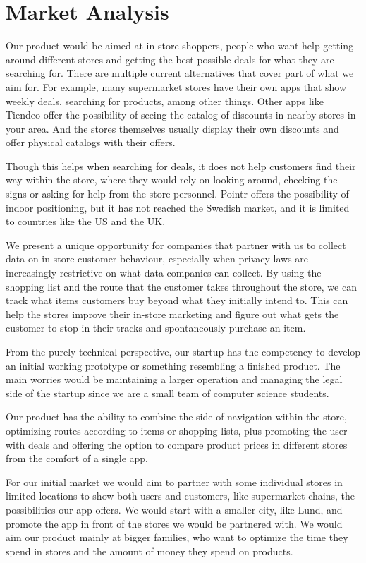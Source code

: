 \documentclass[titlepage]{article}
\begin{document}
\section{Market Analysis}
Our product would be aimed at in-store shoppers, people who want help getting around different stores and getting the best possible deals for what they are searching for. There are multiple current alternatives that cover part of what we aim for. For example, many supermarket stores have their own apps that show weekly deals, searching for products, among other things. Other apps like Tiendeo offer the possibility of seeing the catalog of discounts in nearby stores in your area. And the stores themselves usually display their own discounts and offer physical catalogs with their offers. 

Though this helps when searching for deals, it does not help customers find their way within the store, where they would rely on looking around, checking the signs or asking for help from the store personnel. Pointr offers the possibility of indoor positioning, but it has not reached the Swedish market, and it is limited to countries like the US and the UK. 

We present a unique opportunity for companies that partner with us to collect data on in-store customer behaviour, especially when privacy laws are increasingly restrictive on what data companies can collect. By using the shopping list and the route that the customer takes throughout the store, we can track what items customers buy beyond what they initially intend to. This can help the stores improve their in-store marketing and figure out what gets the customer to stop in their tracks and spontaneously purchase an item.

From the purely technical perspective, our startup has the competency to develop an initial working prototype or something resembling a finished product. The main worries would be maintaining a larger operation and managing the legal side of the startup since we are a small team of computer science students.

Our product has the ability to combine the side of navigation within the store, optimizing routes according to items or shopping lists, plus promoting the user with deals and offering the option to compare product prices in different stores from the comfort of a single app.

For our initial market we would aim to partner with some individual stores in limited locations to show both users and customers, like supermarket chains, the possibilities our app offers. We would start with a smaller city, like Lund, and promote the app in front of the stores we would be partnered with. We would aim our product mainly at bigger families, who want to optimize the time they spend in stores and the amount of money they spend on products.
\end{document}
